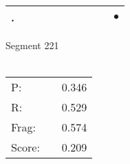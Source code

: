 \documentclass[landscape]{article}
\newcommand{\ssp}{\hspace{2pt}}
\newcommand{\mex}{\cellcolor{g}$\bullet$}
\begin{document}
\begin{tabular}{|l|p{10pt}|p{10pt}|p{10pt}|p{10pt}|p{10pt}|p{10pt}|p{10pt}|p{10pt}|p{10pt}|}
\hline
\ssp \cellcolor{ref8}. \ssp&\hspace{2pt}&\hspace{2pt}&\hspace{2pt}&\hspace{2pt}&\hspace{2pt}&\hspace{2pt}&\hspace{2pt}&\hspace{2pt}&\hspace{2pt}\mex\\
\hline
\end{tabular}

\vspace{6pt}
\noindent Segment 221\\\\
\noindent\begin{tabular}{lm{12pt}r}
\hline
P:&&0.346\\
R:&&0.529\\
Frag:&&0.574\\
Score:&&0.209\\
\end{tabular}

\newpage
\end{document}
